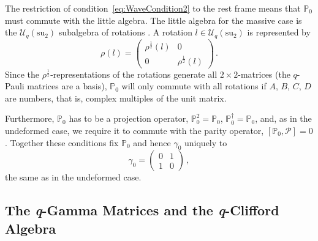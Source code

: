 \documentclass[12pt,a4paper]{article}
\newcommand{\Proj}{\mathbb{P}}
\newcommand{\suq}{{\mathcal{U}_q(\mathrm{su}_2)}}
\begin{document}
The restriction of condition~\eqref{eq:WaveCondition2} to the rest
frame means that $\Proj_0$ must commute with the little algebra. The
little algebra for the massive case is the $\suq$ subalgebra of
rotations \cite{Blohmann:2001a}. A rotation $l\in\suq$ is represented
by
\begin{equation}
  \rho(l) = \begin{pmatrix}
    \rho^{\frac{1}{2}}(l) & 0 \\ 0 & \rho^{\frac{1}{2}}(l)
  \end{pmatrix} \,.
\end{equation} 
Since the $\rho^{\frac{1}{2}}$-representations of the rotations
generate all $2\times2$-matrices (the $q$-Pauli matrices are a basis),
$\Proj_0$ will only commute with all rotations if $A$, $B$, $C$, $D$
are numbers, that is, complex multiples of the unit matrix.

Furthermore, $\Proj_0$ has to be a projection operator, $\Proj_0^2 =
\Proj_0$, $\Proj_0^\dagger = \Proj_0$, and, as in the undeformed case,
we require it to commute with the parity operator,
$[\Proj_0,\mathcal{P}]=0$.  Together these conditions fix $\Proj_0$
and hence $\gamma_0$ uniquely to
\begin{equation}
  \gamma_0 = \begin{pmatrix} 0 & 1 \\ 1 & 0 \end{pmatrix} \,,
\end{equation}
the same as in the undeformed case. 


\subsection{The \textit{q}-Gamma Matrices and the \textit{q}-Clifford Algebra}
\label{sec:gammaboost}
\end{document}
